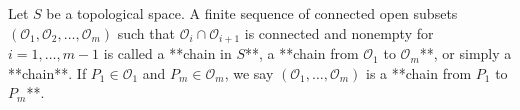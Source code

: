 Let $S$ be a topological space. A finite sequence of connected open subsets $(\mathcal{O}_1, \mathcal{O}_2, \ldots, \mathcal{O}_m)$ such that $\mathcal{O}_i \cap \mathcal{O}_{i+1}$ is connected and nonempty for $i = 1, \ldots, m-1$ is called a **chain in $S$**, a **chain from $\mathcal{O}_1$ to $\mathcal{O}_m$**, or simply a **chain**. If $P_1 \in \mathcal{O}_1$ and $P_m \in \mathcal{O}_m$, we say $(\mathcal{O}_1, \ldots, \mathcal{O}_m)$ is a **chain from $P_1$ to $P_m$**.
